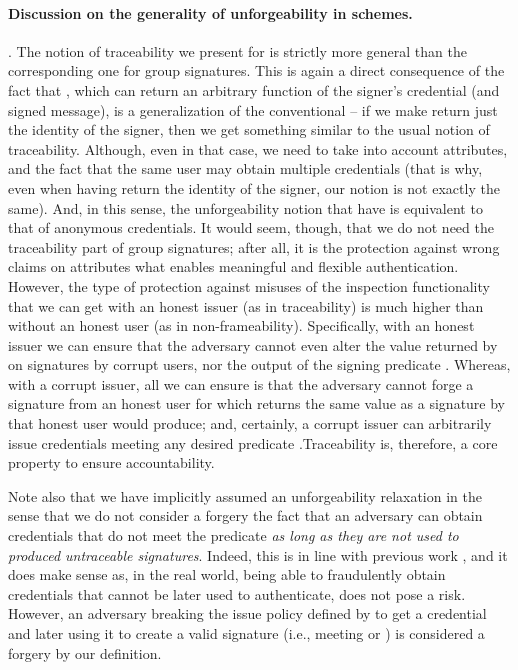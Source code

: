 \paragraph{Discussion on the generality of unforgeability in \UAS schemes.} %
.
The notion of traceability we present for \UAS is strictly more general than
the corresponding one for group signatures. This is again a direct
consequence of the fact that \Inspect, which can return an arbitrary function
of the signer's credential (and signed message), is a generalization of the
conventional \Open -- if we make \Inspect return just the identity of the
signer, then we get something similar to the usual notion of traceability.
Although, even in that case, we need to take into account attributes, and the
fact that the same user may obtain multiple credentials (that is why, even when
having \Inspect return the identity of the signer, our notion is not exactly
the same). And, in this sense, the unforgeability notion that \UAS have is
equivalent to that of anonymous credentials. It would seem, though, that we do
not need the traceability part of group signatures; after all, it is the
protection against wrong claims on attributes what enables meaningful and
flexible authentication. However, the type of protection against misuses of
the inspection functionality that we can get with an honest issuer (as in
traceability) is much higher than without an honest user (as in
non-frameability). Specifically, with an honest issuer we can ensure that
the adversary cannot even alter the value returned by \Inspect on signatures
by corrupt users, nor the output of the signing predicate \feval. Whereas, with
a corrupt issuer, all we can ensure is that
the adversary cannot forge a signature from an honest user for which \Inspect
returns the same value as a signature by that honest user would produce; and,
certainly, a corrupt issuer can arbitrarily issue credentials meeting any
desired predicate \feval .Traceability is, therefore, a core property to ensure
accountability.

Note also that we have implicitly assumed an unforgeability relaxation in the
sense that we do not consider a forgery the fact that an adversary can obtain
credentials that do not meet the \fissue predicate \emph{as long as they are
  not used to produced untraceable signatures}. Indeed, this is in line with
previous work \cite[Section 3.3.3]{ckl+15}, and it does make sense as, in the
real world, being able to fraudulently obtain credentials that cannot be later
used to authenticate, does not pose a risk. However, an adversary breaking
the issue policy defined by \fissue to get a credential and later using it to
create a valid signature (i.e., meeting \feval or \finsp) is considered a
forgery by our definition.

